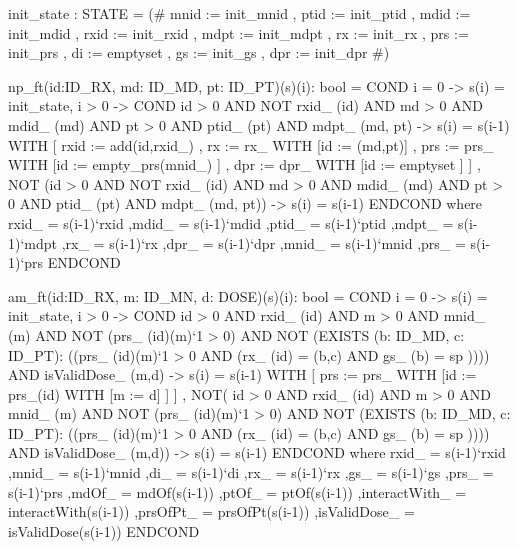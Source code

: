 \begin{pvs}
  init_state : STATE =
       (# mnid := init_mnid
        , ptid := init_ptid
        , mdid := init_mdid
        , rxid := init_rxid
       	, mdpt := init_mdpt 
        , rx := init_rx
        , prs := init_prs
        , di := emptyset
        , gs := init_gs
        , dpr := init_dpr
        #)

  np_ft(id:ID_RX, md: ID_MD, pt: ID_PT)(s)(i): bool =
    COND
	i = 0 -> s(i) = init_state,
	i > 0 ->
	COND
	id > 0
	AND NOT rxid_ (id)
	AND md > 0
        AND mdid_ (md)
	AND pt > 0
        AND ptid_ (pt)
	AND mdpt_ (md, pt) ->
	       s(i) = s(i-1) 
	       WITH  [ rxid := add(id,rxid_)
		     , rx  := rx_ WITH [id := (md,pt)]
		     , prs := prs_ WITH [id := empty_prs(mnid_) ]
		     , dpr := dpr_ WITH [id := emptyset ] 
		    ] ,
        NOT (id > 0
        AND NOT rxid_ (id)
        AND md > 0
        AND mdid_ (md)
        AND pt > 0
        AND ptid_ (pt)
        AND mdpt_ (md, pt))
          -> s(i) = s(i-1)
    ENDCOND
    where
       rxid_ = s(i-1)`rxid
      ,mdid_ = s(i-1)`mdid
      ,ptid_ = s(i-1)`ptid
      ,mdpt_ = s(i-1)`mdpt
      ,rx_   = s(i-1)`rx
      ,dpr_  = s(i-1)`dpr
      ,mnid_ = s(i-1)`mnid
      ,prs_ = s(i-1)`prs
      ENDCOND      

  am_ft(id:ID_RX, m: ID_MN, d: DOSE)(s)(i): bool =
    COND
	i = 0 -> s(i) = init_state,
        i > 0 -> COND
	id > 0 
	AND rxid_ (id)
	AND m > 0 
	AND mnid_ (m)
	AND NOT (prs_ (id)(m)`1 > 0)
	AND NOT (EXISTS (b: ID_MD, c: ID_PT): 
	((prs_ (id)(m)`1 > 0 AND (rx_ (id) = (b,c) 
	AND gs_ (b) = sp ))))
	AND isValidDose_ (m,d)
            -> s(i) = s(i-1) WITH [ prs := prs_ 
            WITH [id := prs_(id) WITH [m := d] ] ]
     , NOT(	id > 0 
	AND rxid_ (id)
	AND m > 0 
	AND mnid_ (m)
	AND NOT (prs_ (id)(m)`1 > 0)
	AND NOT (EXISTS (b: ID_MD, c: ID_PT): 
	((prs_ (id)(m)`1 > 0 AND (rx_ (id) = (b,c) 
	AND gs_ (b) = sp ))))
	AND isValidDose_ (m,d))
        -> s(i) = s(i-1)
    ENDCOND
    where
       rxid_ = s(i-1)`rxid
      ,mnid_ = s(i-1)`mnid
      ,di_ = s(i-1)`di
      ,rx_ = s(i-1)`rx
      ,gs_ = s(i-1)`gs
      ,prs_  = s(i-1)`prs
      ,mdOf_ = mdOf(s(i-1))
      ,ptOf_ = ptOf(s(i-1))
      ,interactWith_ = interactWith(s(i-1))
      ,prsOfPt_ = prsOfPt(s(i-1))
      ,isValidDose_ = isValidDose(s(i-1))
      ENDCOND


\end{pvs}
